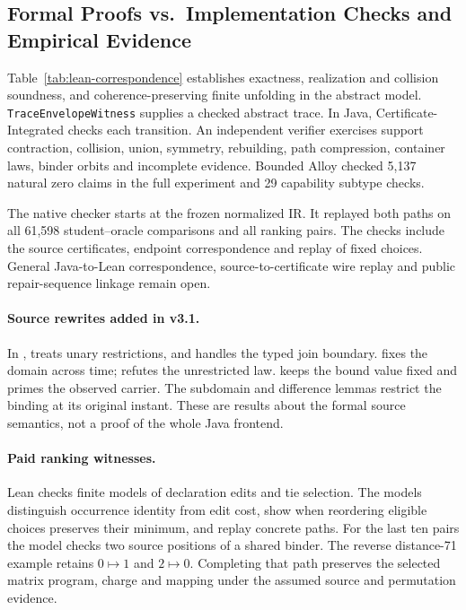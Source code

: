 \subsection{Formal Proofs vs.\ Implementation Checks and Empirical Evidence}

Table~\ref{tab:lean-correspondence} establishes exactness, realization and
collision soundness, and coherence-preserving finite unfolding in the
abstract model. \texttt{TraceEnvelopeWitness} supplies a checked abstract trace.
In Java, Certificate-Integrated checks each transition. An independent
verifier exercises support contraction, collision, union, symmetry,
rebuilding, path compression, container laws, binder orbits and incomplete
evidence. Bounded Alloy checked 5,137 natural zero claims in the full
experiment and 29 capability subtype checks.

The native checker starts at the frozen normalized IR. It replayed both
paths on all 61,598 student--oracle comparisons and all \replayPairs{}
ranking pairs. The checks include the source
certificates, endpoint correspondence and replay of fixed choices.
General Java-to-Lean correspondence, source-to-certificate wire replay
and public repair-sequence linkage remain open.

\paragraph{Source rewrites added in v3.1.}
In ,
 treats unary restrictions, and
 handles the typed join boundary.
 fixes the domain across time;
 refutes the unrestricted law.
 keeps the bound value fixed and primes
the observed carrier. The subdomain and difference lemmas restrict the
binding at its original instant. These are results about the formal source
semantics, not a proof of the whole Java frontend.

\paragraph{Paid ranking witnesses.}
Lean checks finite models of declaration edits and tie selection. The
models distinguish occurrence identity from edit cost, show when reordering
eligible choices preserves their minimum, and replay concrete paths. For
the last ten pairs the model checks two source positions of a shared binder.
The reverse distance-71 example retains $0\mapsto1$ and $2\mapsto0$.
Completing that path preserves the selected matrix program, charge and
mapping under the assumed source and permutation evidence.
